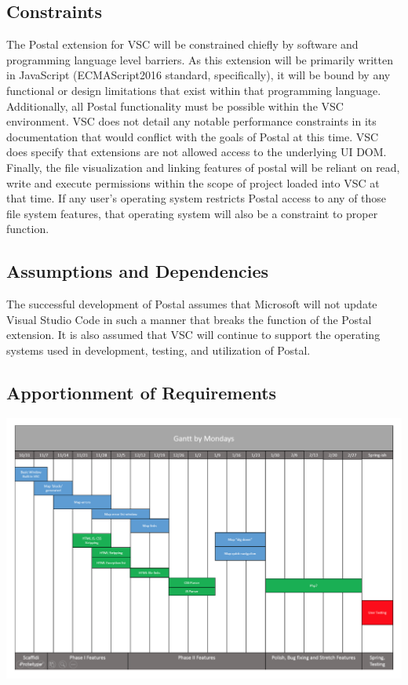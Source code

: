 \documentclass[letterpaper,10pt,titlepage,draftclsnofoot,onecolumn,onesided] {IEEEtran}
\begin{document}
\subsection{Constraints}
The Postal extension for VSC will be constrained chiefly by software and programming language level barriers.
As this extension will be primarily written in JavaScript (ECMAScript2016 standard, specifically), it will be bound by any functional or design limitations that exist within that programming language. 
Additionally, all Postal functionality must be possible within the VSC environment. 
VSC does not detail any notable performance constraints in its documentation that would conflict with the goals of Postal at this time. 
VSC does specify that extensions are not allowed access to the underlying UI DOM.
Finally, the file visualization and linking features of postal will be reliant on read, write and execute permissions within the scope of project loaded into VSC at that time.
If any user's operating system restricts Postal access to any of those file system features, that operating system will also be a constraint to proper function.

\subsection{Assumptions and Dependencies}
The successful development of Postal assumes that Microsoft will not update Visual Studio Code in such a manner that breaks the function of the Postal extension. 
It is also assumed that VSC will continue to support the operating systems used in development, testing, and utilization of Postal.

\subsection{Apportionment of Requirements}
\includegraphics[scale=0.7]{gantt.png}
\end{document}

